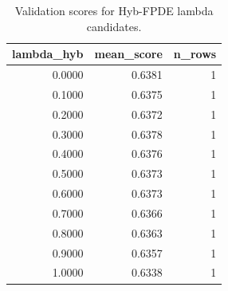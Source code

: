 \begin{table}[t]
\caption{Validation scores for Hyb-FPDE lambda candidates.}
\label{tab:lambda_distribution_computed}
\centering
\begin{tabular}{rrr}
\toprule
lambda\_hyb & mean\_score & n\_rows \\
\midrule
0.0000 & 0.6381 & 1 \\
0.1000 & 0.6375 & 1 \\
0.2000 & 0.6372 & 1 \\
0.3000 & 0.6378 & 1 \\
0.4000 & 0.6376 & 1 \\
0.5000 & 0.6373 & 1 \\
0.6000 & 0.6373 & 1 \\
0.7000 & 0.6366 & 1 \\
0.8000 & 0.6363 & 1 \\
0.9000 & 0.6357 & 1 \\
1.0000 & 0.6338 & 1 \\
\bottomrule
\end{tabular}

\end{table}
